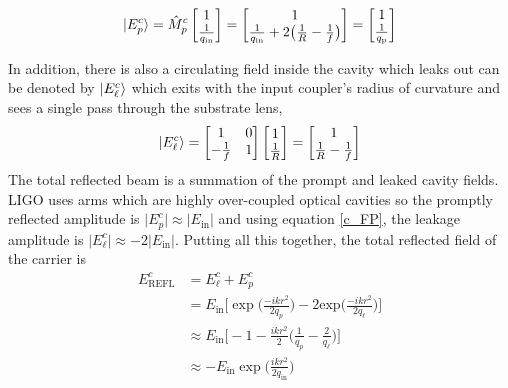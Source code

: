 		\begin{equation}\label{eq:promptE}
		 \ket{E^{c}_{p}}=
		 \hat{M}^{c}_{p}
		 \begin{bmatrix}
		 					1  
		 \\ 	\frac{1}{q_{\text{in}}}
		 \end{bmatrix}
		 =
		 \begin{bmatrix}
		 1  
		 \\ 	\frac{1}{q_{\text{in}}} + 2 \big(\frac{1}{R} - \frac{1}{f}\big)
		 \end{bmatrix}
		 =
		 \begin{bmatrix}
		 1  
		 \\ 	\frac{1}{q_{\text{p}}}
		 \end{bmatrix}
		\end{equation}
		
		In addition, there is also a circulating field inside the cavity which leaks out can be denoted by $\ket{E^c_{\ell}}$ which exits with the input coupler's radius of curvature and sees a single pass through the substrate lens,
		\begin{equation}\label{eq:leakE}
		\ket{E^c_{\ell}} = 		 
		\begin{bmatrix}
		1 	&	0 
		\\ 	-\frac{1}{f} 	&	1
		\end{bmatrix}
		\begin{bmatrix}
		1  
		\\ 	\frac{1}{R}
		\end{bmatrix}
		=
		\begin{bmatrix}
		1  
		\\ 	\frac{1}{R} - \frac{1}{f}
		\end{bmatrix}
		\end{equation}
		The total reflected beam is a summation of the prompt and leaked cavity fields.  LIGO uses arms which are highly over-coupled optical cavities so the promptly reflected amplitude is $\vert E^c_p \vert \approx \vert E_{\text{in}} \vert$ and using equation \ref{c_FP}, the leakage amplitude is $\vert E^c_\ell \vert \approx -2\vert E_{\text{in}} \vert$.  Putting all this together, the total reflected field of the carrier is
		\begin{equation}
		\begin{aligned}
		E^c_{\text{REFL}} 	&= E^c_{\ell} + E^c_p \\
							&= E_{\text{in}} \bigg[ \exp \bigg(\frac{-ik r^2}{2q_p}\bigg) - 2  \text{exp} \bigg(\frac{-ik r^2}{2q_{\ell}}\bigg) \bigg]\\
							&\approx E_{\text{in}} \bigg[ -1 - \frac{ikr^2}{2} \bigg( \frac{1}{q_p} - \frac{2}{q_\ell} \bigg) \bigg]\\
							&\approx -E_{\text{in}} \exp\bigg(\frac{ikr^2}{2q_{\text{in}}}\bigg) 
		\end{aligned} 
		\end{equation}
